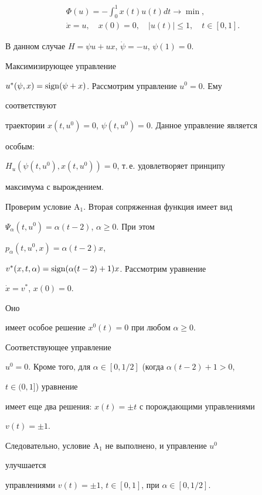 \begin{gather*} 


\Phi(u)=-\int^1_0 x(t)u(t)dt\to\min,\\ 


\Dot x=u,\quad x(0)=0,\quad |u(t)|\le 1,\quad t\in[0,1]. 


\end{gather*} 


В данном случае $H=\psi u+ux$, $\Dot\psi=-u$, $\psi(1)=0$. 


Максимизирующее управление 


$u^*(\psi,x)=\operatorname{sign}(\psi+x)$. Рассмотрим управление $u^0=0$. Ему 


соответствуют 


траектории $x(t,u^0)=0$, $\psi(t,u^0)=0$. Данное управление является 


особым: 


$H_u(\psi(t,u^0),x(t,u^0))=0$, т.\,е.{} удовлетворяет принципу 


максимума с вырождением. 


 


Проверим условие A${}_1$. Вторая сопряженная функция имеет вид 


$\Psi_\alpha(t,u^0)=\alpha(t-2)$, $\alpha\ge 0$. При этом 


$p_\alpha(t,u^0,x)=\alpha(t-2)x$, 


$v^*(x,t,\alpha)=\operatorname{sign}(\alpha(t-2)+1)x$. Рассмотрим уравнение 


$\Dot x=v^*$, $x(0)=0$. 


Оно 


имеет особое решение $x^0(t)=0$ при любом $\alpha\ge 0$. 


Соответствующее управление 


$u^0=0$. Кроме того, для $\alpha\in[0,1/2]$ (когда $\alpha(t-2)+1>0$, 


$t\in(0,1]$) уравнение 


имеет еще два решения: $x(t)=\pm t$ с порождающими управлениями 


$v(t)=\pm 1$. 


 


Следовательно, условие A${}_1$ не выполнено, и управление $u^0$ 


улучшается 


управлениями $v(t)=\pm 1$, $t\in[0,1]$, при $\alpha\in[0,1/2]$. 


 


